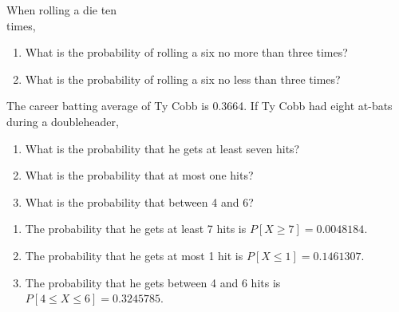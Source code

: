 \documentclass[11pt, chapterprefix=true]{scrbook}\usepackage[]{graphicx}\usepackage[]{color}
\begin{document}
\begin{exercises}
  \begin{exercise} %

When rolling a die ten \\ times,

\begin{enumerate}
\item What is the probability of rolling a six no more than three times?
\item What is the probability of rolling a six no less  than three times?
\end{enumerate}
	\end{exercise}
%
%

  \begin{exercise} %

The career batting average of Ty Cobb is 0.3664. If Ty Cobb had eight at-bats during a doubleheader,

\begin{enumerate}
\item What is the probability that he gets at least seven hits?
\item What is the probability that at most one hits?
\item What is the probability that between 4 and 6?
\end{enumerate}
	\end{exercise}
	\begin{solution}  %


\begin{enumerate}
\item The probability that he gets at least 7 hits is $P[X \ge 7] = 0.0048184$.
\item The probability that he gets at most 1 hit is $P[X \le 1] = 0.1461307$.
\item The probability that he gets between 4 and 6 hits is $P[4 \le X \le 6] = 0.3245785$.
\end{enumerate}


\end{solution}
\end{exercises}
\end{document}
